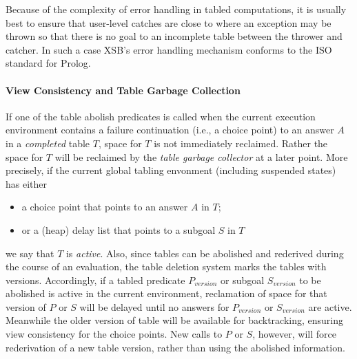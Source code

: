\begin{description}
Because of the complexity of error handling in tabled computations, it
is usually best to ensure that user-level catches are close to where
an exception may be thrown so that there is no goal to an incomplete
table between the thrower and catcher. In such a case XSB's error
handling mechanism conforms to the ISO standard for Prolog.

\paragraph{View Consistency and Table Garbage Collection}
If one of the table abolish predicates is called when the current
execution environment contains a failure continuation (i.e., a choice
point) to an answer $A$ in a {\em completed} table $T$, space for $T$
is not immediately reclaimed.  Rather the space for $T$ will be
reclaimed by the {\em table garbage collector} at a later point.  More
precisely, if the current global tabling envonment (including
suspended states) has either
\begin{itemize}
\item a choice point that points to an answer $A$ in $T$; 
\item or a (heap) delay list that points to a subgoal $S$ in $T$
\end{itemize}
we say that $T$ is {\em active}.  Also, since tables can be abolished
and rederived during the course of an evaluation, the table deletion
system marks the tables with versions.  Accordingly, if a tabled
predicate $P_{version}$ or subgoal $S_{version}$ to be abolished is
active in the current environment, reclamation of space for that
version of $P$ or $S$ will be delayed until no answers for
$P_{version}$ or $S_{version}$ are active.  Meanwhile the older
version of table will be available for backtracking, ensuring view
consistency for the choice points.  New calls to $P$ or $S$, however,
will force rederivation of a new table version, rather than using the
abolished information.

 

\end{description}
